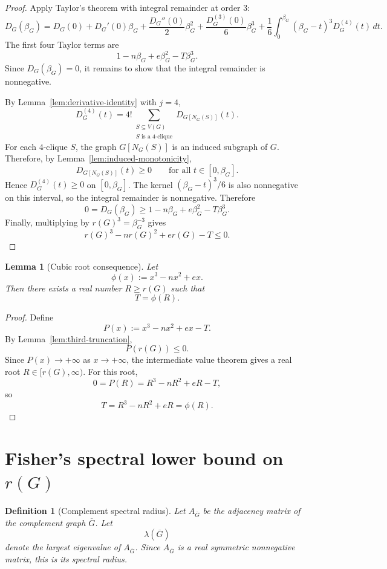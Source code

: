 \documentclass[11pt]{article}
\newtheorem{lemma}[theorem]{Lemma}
\newtheorem{definition}[theorem]{Definition}
\newcommand{\V}{V}
\begin{document}
\begin{proof}
Apply Taylor's theorem with integral remainder at order \(3\):
\[
        D_G(\beta_G)
        =
        D_G(0)+D_G'(0)\beta_G+\frac{D_G''(0)}{2}\beta_G^2
        +\frac{D_G^{(3)}(0)}{6}\beta_G^3
        +
        \frac{1}{6}\int_0^{\beta_G}(\beta_G-t)^3D_G^{(4)}(t)\,dt.
\]
The first four Taylor terms are
\[
        1-n\beta_G+e\beta_G^2-T\beta_G^3.
\]
Since \(D_G(\beta_G)=0\), it remains to show that the integral remainder is nonnegative.

By Lemma~\ref{lem:derivative-identity} with \(j=4\),
\[
        D_G^{(4)}(t)
        =
        4!
        \sum_{\substack{S\subseteq\V(G)\\S\text{ is a }4\text{-clique}}}
        D_{G[N_G(S)]}(t).
\]
For each \(4\)-clique \(S\), the graph \(G[N_G(S)]\) is an induced subgraph of \(G\).
Therefore, by Lemma~\ref{lem:induced-monotonicity},
\[
        D_{G[N_G(S)]}(t)\ge 0
        \qquad\text{for all }t\in[0,\beta_G].
\]
Hence \(D_G^{(4)}(t)\ge 0\) on \([0,\beta_G]\).  The kernel
\((\beta_G-t)^3/6\) is also nonnegative on this interval, so the integral remainder is
nonnegative.  Therefore
\[
        0
        =
        D_G(\beta_G)
        \ge
        1-n\beta_G+e\beta_G^2-T\beta_G^3.
\]
Finally, multiplying by \(r(G)^3=\beta_G^{-3}\) gives
\[
        r(G)^3-nr(G)^2+er(G)-T\le 0.
\]
\end{proof}

\begin{lemma}[Cubic root consequence]
\label{lem:cubic-root-consequence}
Let
\[
        \phi(x):=x^3-nx^2+ex.
\]
Then there exists a real number \(R\ge r(G)\) such that
\[
        T=\phi(R).
\]
\end{lemma}

\begin{proof}
Define
\[
        P(x):=x^3-nx^2+ex-T.
\]
By Lemma~\ref{lem:third-truncation},
\[
        P(r(G))\le 0.
\]
Since \(P(x)\to +\infty\) as \(x\to+\infty\), the intermediate value theorem gives
a real root \(R\in[r(G),\infty)\).  For this root,
\[
        0=P(R)=R^3-nR^2+eR-T,
\]
so
\[
        T=R^3-nR^2+eR=\phi(R).
\]
\end{proof}

\section{Fisher's spectral lower bound on \(r(G)\)}

\begin{definition}[Complement spectral radius]
Let \(A_{\overline G}\) be the adjacency matrix of the complement graph \(\overline G\).
Let
\[
        \lambda(\overline G)
\]
denote the largest eigenvalue of \(A_{\overline G}\).  Since \(A_{\overline G}\) is a
real symmetric nonnegative matrix, this is its spectral radius.
\end{definition}
\end{document}
